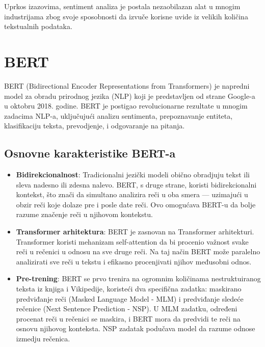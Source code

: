 \documentclass{article}
\begin{document}
Uprkos izazovima, sentiment analiza je postala nezaobilazan alat u mnogim industrijama zbog svoje sposobnosti da izvuče korisne uvide iz velikih količina tekstualnih podataka.
\newpage
\section{BERT}
BERT (Bidirectional Encoder Representations from Transformers) je napredni model za obradu prirodnog jezika (NLP) koji je predstavljen od strane Google-a u oktobru 2018. godine. BERT je postigao revolucionarne rezultate u mnogim zadacima NLP-a, uključujući analizu sentimenta, prepoznavanje entiteta, klasifikaciju teksta, prevodjenje, i odgovaranje na pitanja.
\subsection{Osnovne karakteristike BERT-a}
\begin{itemize}
    \item \textbf{Bidirekcionalnost}: Tradicionalni jezički modeli obično obradjuju tekst ili sleva nadesno ili zdesna nalevo. BERT, s druge strane, koristi bidirekcionalni kontekst, što znači da simultano analizira reči u oba smera — uzimajući u obzir reči koje dolaze pre i posle date reči. Ovo omogućava BERT-u da bolje razume značenje reči u njihovom kontekstu.
    \item \textbf{Transformer arhitektura}: BERT je zasnovan na Transformer arhitekturi. Transformer koristi mehanizam self-attention da bi procenio važnost svake reči u rečenici u odnosu na sve druge reči. Na taj način BERT može paralelno analizirati sve reči u tekstu i efikasno procenjivati njihov međusobni odnos.
    \item \textbf{Pre-trening}: BERT se prvo trenira na ogromnim količinama nestruktuiranog teksta iz knjiga i Vikipedije, koristeći dva specifična zadatka: maskirano predviđanje reči (Masked Language Model - MLM) i predviđanje sledeće rečenice (Next Sentence Prediction - NSP). U MLM zadatku, određeni procenat reči u rečenici se maskira, i BERT mora da predvidi te reči na osnovu njihovog konteksta. NSP zadatak podučava model da razume odnose izmedju rečenica.
\end{itemize}
\end{document}
